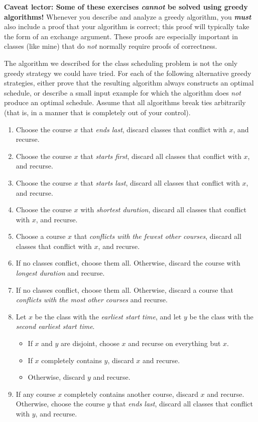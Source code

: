 \begin{exercises}
\item[]\textbf{Caveat lector: Some of these exercises \textit{cannot} be solved using greedy algorithms!} Whenever you describe and analyze a greedy algorithm, you \textbf{\textit{must}} also include a proof that your algorithm is correct; this proof will typically take the form of an exchange argument. These proofs are especially important in classes (like mine) that do \textit{not} normally require proofs of correctness.

\item The  algorithm we described for the class scheduling problem is not the only greedy strategy we could have tried. For each of the following alternative greedy strategies, either prove that the resulting algorithm always constructs an optimal schedule, or describe a small input example for which the algorithm does \textit{not} produce an optimal schedule. Assume that all algorithms break ties arbitrarily (that is, in a manner that is completely out of your control). 
\begin{enumerate}[label=(\alph*)]
\item Choose the course $x$ that \textit{ends last}, discard classes that conflict with $x$, and recurse.
\item Choose the course $x$ that \textit{starts first}, discard all classes that conflict with $x$, and recurse.
\item Choose the course $x$ that \textit{starts last}, discard all classes that conflict with $x$, and recurse.
\item Choose the course $x$ with \textit{shortest duration}, discard all classes that conflict with $x$, and recurse.
\item Choose a course $x$ that \textit{conflicts with the fewest other courses}, discard all classes that conflict with $x$, and recurse.
\item If no classes conflict, choose them all. Otherwise, discard the course with \textit{longest duration} and recurse.
\item If no classes conflict, choose them all. Otherwise, discard a course that \textit{conflicts with the most other courses} and recurse.
\item Let $x$ be the class with the \textit{earliest start time}, and let $y$ be the class with the \textit{second earliest start time}.
\begin{itemize}
\item If $x$ and $y$ are disjoint, choose $x$ and recurse on everything but $x$.
\item If $x$ completely contains $y$, discard $x$ and recurse.
\item Otherwise, discard $y$ and recurse.
\end{itemize}
\item If any course $x$ completely contains another course, discard $x$ and recurse. Otherwise, choose the course $y$ that \textit{ends last}, discard all classes that conflict with $y$, and recurse.
\end{enumerate}


\end{exercises}
